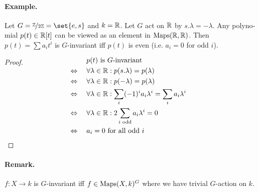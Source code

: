 \documentclass[12pt,a4paper]{scrartcl}
\theoremstyle{cplain}
\theoremstyle{cplain}
\theoremstyle{cplain}
\theoremstyle{definition}
\begin{document}
\begin{otherlanguage}{english}
\paragraph{Example.}
Let $G= \fak\IZ{2\IZ} = \set{e,s}$ and $k=\mathbb R$. Let $G$ act on $\mathbb R$ by $s.\lambda = -\lambda$. Any polynomial $p(t) \in \mathbb R[t]$ can be viewed as an element in $\operatorname{Maps}(\mathbb R,\mathbb R)$. Then $p(t) = \sum a_it^i$ is $G$-invariant iff $p(t)$ is even (i.e. $a_i=0$ for odd $i$).
\begin{proof}
  \begin{align*}
    \qedherea
    &\phantom{{}\Leftrightarrow{}}\quad \text{$p(t)$ is $G$-invariant} \\
    &\Leftrightarrow\quad \forall \lambda \in \IR: p(s.\lambda) = p(\lambda) \\
    &\Leftrightarrow\quad \forall \lambda \in \IR: p(-\lambda) = p(\lambda) \\
    &\Leftrightarrow\quad \forall \lambda \in \IR: \sum_i (-1)^ia_i \lambda^i = \sum_i a_i \lambda^i \\
    &\Leftrightarrow\quad \forall \lambda \in \IR: 2 \sum_{\text{$i$ odd}} a_i\lambda^i = 0 \\
    &\Leftrightarrow\quad \text{$a_i=0$ for all odd $i$}
    \qedhere
  \end{align*}
\end{proof}

\paragraph{Remark.}
$f\colon X \to k$ is $G$-invariant iff $f\in \operatorname{Maps}(X,k)^G$ where we have trivial $G$-action on $k$.


\end{otherlanguage}
\end{document}
